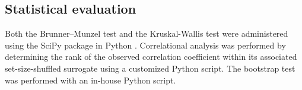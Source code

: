 \subsection{Statistical evaluation}
Both the Brunner--Munzel test and the Kruskal-Wallis test were administered using the SciPy package in Python \cite{virtanen_scipy_2020}. Correlational analysis was performed by determining the rank of the observed correlation coefficient within its associated set-size-shuffled surrogate using a customized Python script. The bootstrap test was performed with an in-house Python script.
\label{sec:methods}